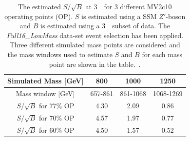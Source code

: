 \begin{table}[ht]
\begin{center}
\begin{tabular}{|c||c|c|c|}
  \hline
  Simulated Mass [GeV]            &   800       &  1000       & 1250\\
  \hline
  Mass window [GeV]               &  657-861    &  861-1068   & 1068-1269 \\
  \hline
  $S/\sqrt{B}$ for 77\% OP        &  4.30       &  2.09       & 0.86     \\
  $S/\sqrt{B}$ for 70\% OP        &  4.57       &  1.97       & 0.77     \\
  $S/\sqrt{B}$ for 60\% OP        &  4.50       &  1.57       & 0.52     \\
  \hline
\end{tabular}
\caption[The estimated $S/\sqrt{B}$ at 3~\ifb~for 3 different MV2c10 operating points (OP).
  $S$ is estimated using a SSM $Z'$-boson and $B$ is estimated using a 3~\ifb~subset of data.
  The \textit{Full16\_LowMass} data-set event selection has been applied.
  Three different simulated mass points are considered and the mass windows used
  to estimate $S$ and $B$ for each mass point are shown in the table.]
        {The estimated $S/\sqrt{B}$ at 3~\ifb~for 3 different MV2c10 operating points (OP).
          $S$ is estimated using a SSM $Z'$-boson and $B$ is estimated using a 3~\ifb~subset of data.
          The \textit{Full16\_LowMass} data-set event selection has been applied.
          Three different simulated mass points are considered and the mass windows used
          to estimate $S$ and $B$ for each mass point are shown in the table.~\cite{dibjet-full_int}.}
\vspace{-2em}
\label{tab:evt-btag_lm}
\end{center}
\end{table}



